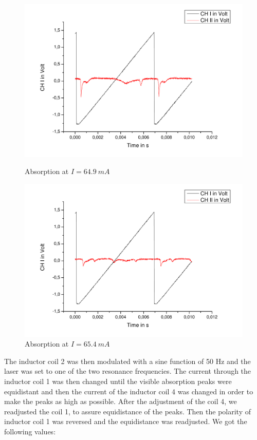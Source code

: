 \begin{figure}[H] 
\begin{minipage}{0.5\textwidth} 
\centering \includegraphics[width=\textwidth]{BilderAusw/DR_1.pdf}
\caption{Absorption at $I = 64.9\ mA$}
\end{minipage}
\begin{minipage}{0.5\textwidth} 
\centering \includegraphics[width=\textwidth]{BilderAusw/DR_2.pdf}
\caption{Absorption at $I = 65.4\ mA$}
\end{minipage}
\end{figure}

The inductor coil 2 was then modulated with a sine function of 50 Hz and the laser was set to one of the two resonance frequencies. The current through the inductor coil 1 was then changed until the visible absorption peaks were equidistant and then the current of the inductor coil 4 was changed in order to make the peaks as high as possible. After the adjustment of the coil 4, we readjusted the coil 1, to assure equidistance of the peaks. Then the polarity of inductor coil 1 was reversed and the equidistance was readjusted. We got the following values:

